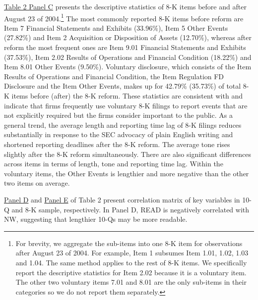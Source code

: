 \documentclass[letterpaper,11pt]{article}
\begin{document}
\begin{spacing}{1.5}
\hyperref[T2PC]{Table 2 Panel C} presents the descriptive statistics of 8-K items before and after August 23 of 2004.\footnote{For brevity, we aggregate the sub-items into one 8-K item for observations after August 23 of 2004. For example, Item 1 subsumes Item 1.01, 1.02, 1.03 and 1.04. The same method applies to the rest of 8-K items. We specifically report the descriptive statistics for Item 2.02 because it is a voluntary item. The other two voluntary items 7.01 and 8.01 are the only sub-items in their categories so we do not report them separately.} The most commonly reported 8-K items before reform are Item 7 Financial Statements and Exhibits (33.96\%), Item 5 Other Events (27.82\%) and Item 2 Acquisition or Disposition of Assets (12.70\%), whereas after reform the most frequent ones are Item 9.01 Financial Statements and Exhibits (37.53\%), Item 2.02 Results of Operations and Financial Condition (18.22\%) and Item 8.01 Other Events (9.50\%). Voluntary disclosure, which consists of the Item Results of Operations and Financial Condition, the Item Regulation FD Disclosure and the Item Other Events, makes up for 42.79\% (35.73\%) of total 8-K items before (after) the 8-K reform. These statistics are consistent with  and indicate that firms frequently use voluntary 8-K filings to report events that are not explicitly required but the firms consider important to the public. As a general trend, the average length and reporting time lag of 8-K filings reduces substantially in response to the SEC advocacy of plain English writing and shortened reporting deadlines after the 8-K reform. The average tone rises slightly after the 8-K reform simultaneously. There are also significant differences across items in terms of length, tone and reporting time lag. Within the voluntary items, the Other Events is lengthier and more negative than the other two items on average. 

\hyperref[T2PD]{Panel D} and \hyperref[T2PE]{Panel E} of Table 2 present correlation matrix of key variables in 10-Q and 8-K sample, respectively. In Panel D, READ is negatively correlated with NW, suggesting that lengthier 10-Qs may be more readable.


\end{spacing}
\end{document}
